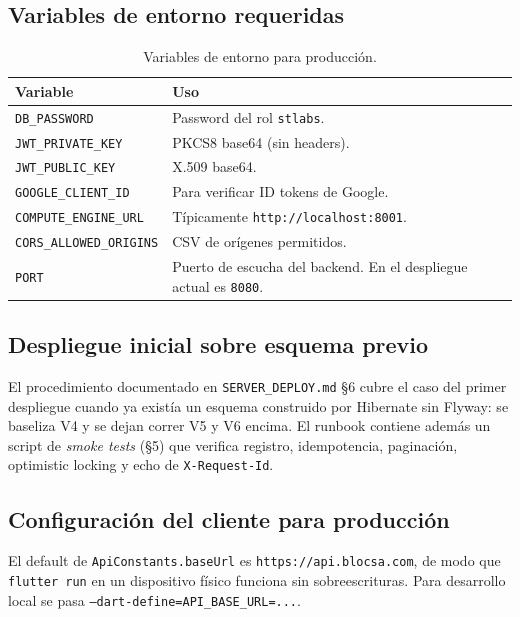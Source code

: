 \documentclass[11pt,a4paper]{article}
\newcommand{\cls}[1]{\texttt{\small #1}}
\begin{document}
\subsection{Variables de entorno requeridas}

\begin{table}[H]
\centering
\begin{tabularx}{\textwidth}{lX}
\toprule
\textbf{Variable} & \textbf{Uso} \\
\midrule
\texttt{DB\_PASSWORD}         & Password del rol \texttt{stlabs}. \\
\texttt{JWT\_PRIVATE\_KEY}    & PKCS8 base64 (sin headers). \\
\texttt{JWT\_PUBLIC\_KEY}     & X.509 base64. \\
\texttt{GOOGLE\_CLIENT\_ID}   & Para verificar ID tokens de Google. \\
\texttt{COMPUTE\_ENGINE\_URL} & Típicamente \texttt{http://localhost:8001}. \\
\texttt{CORS\_ALLOWED\_ORIGINS} & CSV de orígenes permitidos. \\
\texttt{PORT}                 & Puerto de escucha del backend. En el despliegue actual es \texttt{8080}. \\
\bottomrule
\end{tabularx}
\caption{Variables de entorno para producción.}
\end{table}

\subsection{Despliegue inicial sobre esquema previo}

El procedimiento documentado en \texttt{SERVER\_DEPLOY.md} \S6 cubre el caso del primer despliegue cuando ya existía un esquema construido por Hibernate sin Flyway: se baseliza V4 y se dejan correr V5 y V6 encima. El runbook contiene además un script de \textit{smoke tests} (\S5) que verifica registro, idempotencia, paginación, optimistic locking y echo de \texttt{X-Request-Id}.

\subsection{Configuración del cliente para producción}

El default de \cls{ApiConstants.baseUrl} es \texttt{https://api.blocsa.com}, de modo que \texttt{flutter run} en un dispositivo físico funciona sin sobreescrituras. Para desarrollo local se pasa \texttt{--dart-define=API\_BASE\_URL=...}.
\end{document}
